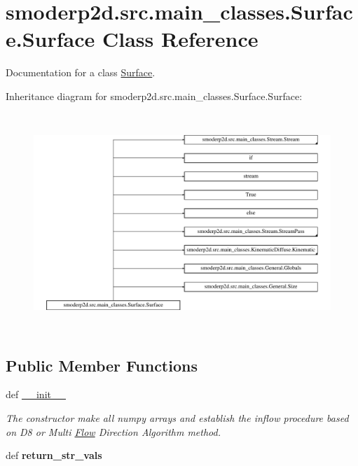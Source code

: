 \hypertarget{classsmoderp2d_1_1src_1_1main__classes_1_1Surface_1_1Surface}{\section{smoderp2d.\-src.\-main\-\_\-classes.\-Surface.\-Surface Class Reference}
\label{classsmoderp2d_1_1src_1_1main__classes_1_1Surface_1_1Surface}
}


Documentation for a class \hyperlink{classsmoderp2d_1_1src_1_1main__classes_1_1Surface_1_1Surface}{Surface}.  


Inheritance diagram for smoderp2d.\-src.\-main\-\_\-classes.\-Surface.\-Surface\-:\begin{figure}[H]
\begin{center}
\leavevmode
\includegraphics[height=8.259586cm]{classsmoderp2d_1_1src_1_1main__classes_1_1Surface_1_1Surface}
\end{center}
\end{figure}
\subsection*{Public Member Functions}
\begin{DoxyCompactItemize}
\item 
\hypertarget{classsmoderp2d_1_1src_1_1main__classes_1_1Surface_1_1Surface_aec5b45550f4b30c9d06d3b29929b8762}{def \hyperlink{classsmoderp2d_1_1src_1_1main__classes_1_1Surface_1_1Surface_aec5b45550f4b30c9d06d3b29929b8762}{\-\_\-\-\_\-init\-\_\-\-\_\-}}\label{classsmoderp2d_1_1src_1_1main__classes_1_1Surface_1_1Surface_aec5b45550f4b30c9d06d3b29929b8762}

\begin{DoxyCompactList}\small\item\em The constructor make all numpy arrays and establish the inflow procedure based on D8 or Multi \hyperlink{namespacesmoderp2d_1_1src_1_1main__classes_1_1Flow}{Flow} Direction Algorithm method. \end{DoxyCompactList}\item 
\hypertarget{classsmoderp2d_1_1src_1_1main__classes_1_1Surface_1_1Surface_aaef794fb6ee3d7681d62cc084c7193bd}{def {\bfseries return\-\_\-str\-\_\-vals}}\label{classsmoderp2d_1_1src_1_1main__classes_1_1Surface_1_1Surface_aaef794fb6ee3d7681d62cc084c7193bd}

\end{DoxyCompactItemize}
